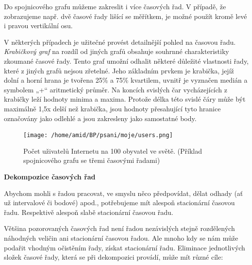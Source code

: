 \documentclass[a4paper,12pt,twoside]{scrreprt}
\begin{document}
Do spojnicového grafu můžeme zakreslit i více časových řad. V případě, že
zobrazujeme např. dvě časové řady lišící se měřítkem, je možné použít kromě levé 
i pravou vertikální osu.

V některých případech je užitečné provést detailnější pohled na časovou řadu.
\textit{Krabičkový graf} na rozdíl od jiných grafů obsahuje souhrnné charakteristiky zkoumané
časové řady. Tento graf umožní odhalit některé důležité vlastnosti řady, které z jiných
grafů nejsou zřetelné. Jeho základním prvkem je krabička, jejíž dolní a horní hrana je
tvořena 25\% a 75\% kvartilem, uvnitř je vyznačen medián a symbolem „+“ aritmetický
průměr. Na koncích svislých čar vycházejících z krabičky leží hodnoty minima a maxima.
Protože délka této svislé čáry může být maximálně 1,5x delší než krabička, jsou hodnoty
přesahující tyto hranice označovány jako odlehlé a jsou zakresleny jako samostatné body.

\begin{figure}
  \centering
  \texttt{[image: /home/amid/BP/psani/moje/users.png]}
  \caption{Počet uživatelů Internetu na 100 obyvatel ve světě. \newline(Příklad spojnicového grafu se třemi časovými řadami)}
  \label{fig:řada}
\end{figure}

\normalsize\textbf{\newline Dekompozice časových řad}

Abychom mohli s řadou pracovat, ve smyslu něco předpovídat, dělat odhady (ať už intervalové
či bodové) apod., potřebujeme mít alespoň stacionární časovou řadu. Respektivě alespoň slabě
stacionární časovou řadu. 

Většina pozorovaných časových řad není řadou nezávislých stejně rozdělených náhodných
veličin ani stacionární časovou řadou. Ale mnoho kdy se nám může podařit vhodným očistěním
řady, získat stacionární řadu. Eliminace jednotlivých složek časové řady, která se při dekompozici provádí, může mít různé cíle:
\end{document}

